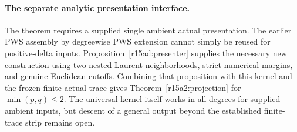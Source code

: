 \paragraph{The separate analytic presentation interface.}
The theorem requires a supplied single ambient actual presentation.
The earlier PWS assembly by degreewise PWS extension cannot simply
be reused for positive-delta inputs. Proposition~\ref{r15ad:presenter}
supplies the necessary new construction using two nested Laurent
neighborhoods, strict numerical margins, and genuine Euclidean
cutoffs. Combining that proposition with this kernel and the frozen
finite actual trace gives Theorem~\ref{r15a2:projection} for
$\min(p,q)\leq2$. The universal kernel itself works in all degrees
for supplied ambient inputs, but descent of a general output beyond
the established finite-trace strip remains open.
